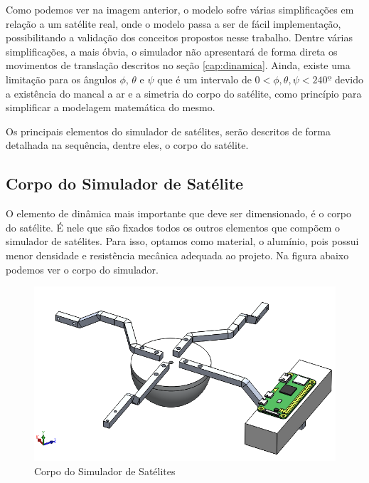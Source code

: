  Como podemos ver na imagem anterior, o modelo sofre várias simplificações em relação a um satélite real, onde o modelo passa a ser de fácil implementação, possibilitando a validação dos conceitos propostos nesse trabalho. Dentre várias simplificações, a mais óbvia, o simulador não apresentará de forma direta os movimentos de translação descritos no seção \ref{cap:dinamica}. Ainda, existe uma limitação para os ângulos $\phi$, $\theta$ e $\psi$ que é um intervalo de $0<\phi, \theta, \psi<240º$ devido a existência do mancal a ar e a simetria do corpo do satélite, como princípio para simplificar a modelagem matemática do mesmo.

Os principais elementos do simulador de satélites, serão descritos de forma detalhada na sequência, dentre eles, o corpo do satélite.



\subsection{Corpo do Simulador de Satélite}

O elemento de dinâmica mais importante que deve ser dimensionado, é o corpo do satélite. É nele que são fixados todos os outros elementos que compõem o simulador de satélites. Para isso, optamos como material, o alumínio, pois possui menor densidade e resistência mecânica adequada ao projeto. Na figura abaixo podemos ver o corpo do simulador.

\begin{figure}[H]
  \caption{Corpo do Simulador de Satélites}
  \begin{center}
      \includegraphics[scale=.45]{metodologia/img/corpo_satelite}
  \end{center}
  \label{fig:corpo_satelite}
\end{figure}


